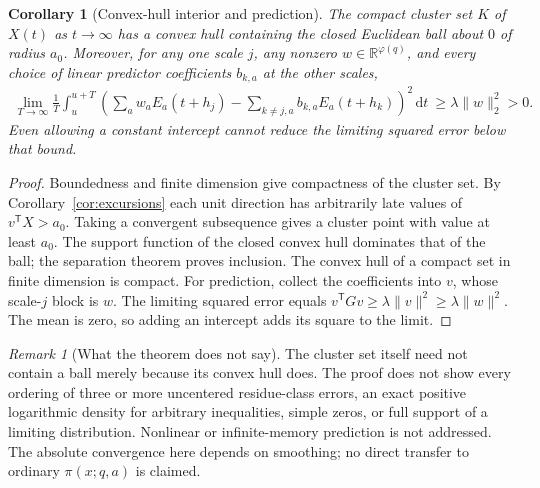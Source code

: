 \documentclass[11pt]{article}
\newtheorem{corollary}[theorem]{Corollary}
\theoremstyle{remark}\newtheorem{remark}[theorem]{Remark}
\newcommand{\R}{\mathbb R}
\newcommand{\dd}{\,\mathrm d}
\newcommand{\ph}{\varphi(q)}
\begin{document}
\begin{corollary}[Convex-hull interior and prediction]\label{cor:prediction}
The compact cluster set $K$ of $X(t)$ as $t\to\infty$ has a convex hull containing the closed Euclidean ball about $0$ of radius $a_0$. Moreover, for any one scale $j$, any nonzero $w\in\R^{\ph}$, and every choice of linear predictor coefficients $b_{k,a}$ at the other scales,
\begin{align*}
 \lim_{T\to\infty}\frac1T\int_{u}^{u+T}
 \left(\sum_a w_a E_a(t+h_j)-\sum_{k\ne j,a}b_{k,a}E_a(t+h_k)\right)^2\dd t
 \ \ge\lambda\|w\|_2^2>0.
\end{align*}
Even allowing a constant intercept cannot reduce the limiting squared error below that bound.
\end{corollary}
\begin{proof}
Boundedness and finite dimension give compactness of the cluster set. By Corollary~\ref{cor:excursions} each unit direction has arbitrarily late values of $v^{\mathsf T}X>a_0$. Taking a convergent subsequence gives a cluster point with value at least $a_0$. The support function of the closed convex hull dominates that of the ball; the separation theorem proves inclusion. The convex hull of a compact set in finite dimension is compact. For prediction, collect the coefficients into $v$, whose scale-$j$ block is $w$. The limiting squared error equals $v^{\mathsf T}Gv\ge\lambda\|v\|^2\ge\lambda\|w\|^2$. The mean is zero, so adding an intercept adds its square to the limit.
\end{proof}

\begin{remark}[What the theorem does not say]
The cluster set itself need not contain a ball merely because its convex hull does. The proof does not show every ordering of three or more uncentered residue-class errors, an exact positive logarithmic density for arbitrary inequalities, simple zeros, or full support of a limiting distribution. Nonlinear or infinite-memory prediction is not addressed. The absolute convergence here depends on smoothing; no direct transfer to ordinary $\pi(x;q,a)$ is claimed.
\end{remark}
\end{document}
